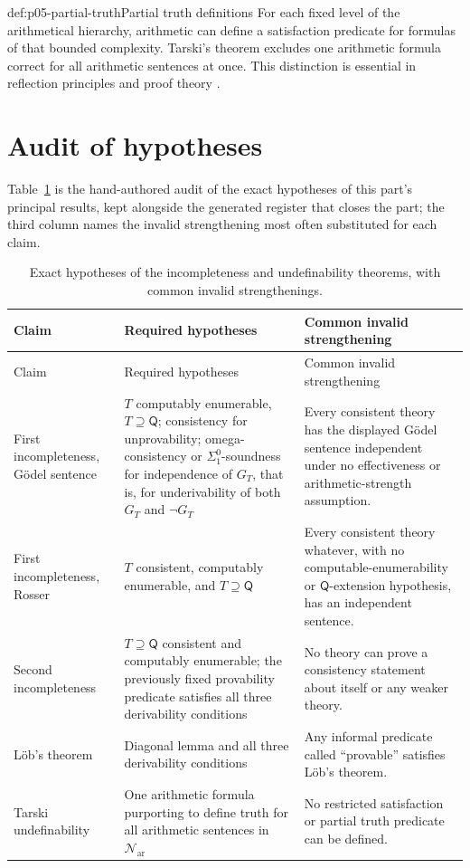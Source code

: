 \begin{hbexample}{def:p05-partial-truth}{Partial truth definitions}
For each fixed level of the arithmetical hierarchy, arithmetic can define
a satisfaction predicate for formulas of that bounded complexity.
Tarski's theorem excludes one arithmetic formula correct for all
arithmetic sentences at once.  This distinction is essential in
reflection principles and proof theory \cite{Tarski1983}.
\end{hbexample}

\section{Audit of hypotheses}
\label{sec:p05-provability-truth-05}

Table~\ref{tab:p05-final-audit} is the hand-authored audit of the exact
hypotheses of this part's principal results, kept alongside the generated
register that closes the part; the third column names the invalid
strengthening most often substituted for each claim.

\begingroup\small
\begin{longtable}{@{}p{}p{}p{}@{}}
\caption{Exact hypotheses of the incompleteness and undefinability
  theorems, with common invalid strengthenings.}
\label{tab:p05-final-audit}\\
\toprule
Claim & Required hypotheses & Common invalid strengthening \\
\midrule
\endfirsthead
\toprule
Claim & Required hypotheses & Common invalid strengthening \\
\midrule
\endhead
First incompleteness, G\"odel sentence & \(T\) computably enumerable,
\(T\supseteq\mathsf Q\); consistency for unprovability; omega-consistency
or \(\Sigma^0_1\)-soundness for independence of \(G_T\), that is, for
underivability of both \(G_T\) and \(\neg G_T\) & Every consistent theory
has the displayed G\"odel sentence independent under no effectiveness or
arithmetic-strength assumption. \\
\addlinespace
First incompleteness, Rosser & \(T\) consistent, computably enumerable,
and \(T\supseteq\mathsf Q\) & Every consistent theory whatever, with no
computable-enumerability or \(\mathsf Q\)-extension hypothesis, has an
independent sentence. \\
\addlinespace
Second incompleteness & \(T\supseteq\mathsf Q\) consistent and computably
enumerable; the previously fixed provability predicate satisfies all
three derivability conditions &
No theory can prove a consistency statement about itself or any weaker
theory. \\
\addlinespace
L\"ob's theorem & Diagonal lemma and all three derivability conditions &
Any informal predicate called ``provable'' satisfies L\"ob's theorem. \\
\addlinespace
Tarski undefinability & One arithmetic formula purporting to define truth
for all arithmetic sentences in \(\mathcal N_{\mathrm{ar}}\) & No restricted
satisfaction or partial truth predicate can be defined. \\
\bottomrule
\end{longtable}
\endgroup
